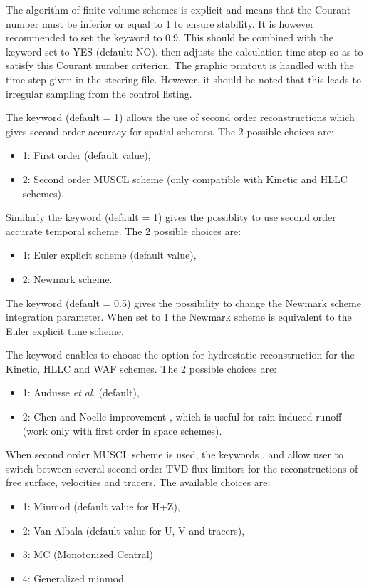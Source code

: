 The algorithm of finite volume schemes is explicit and means that
the Courant number must be inferior or equal to 1 to ensure stability.
It is however recommended to set the keyword 
to 0.9. This should be combined with the keyword 
set to YES (default: NO).
 then adjusts the calculation time step so as to satisfy
this Courant number criterion.
The graphic printout is handled with the time step given in the steering file.
However, it should be noted that this leads to irregular sampling
from the control listing. 

The keyword  (default = 1) allows the
use of second order reconstructions which gives second order accuracy for 
spatial schemes.
The 2 possible choices are:
\begin{itemize}
\item 1: First order (default value),
\item 2: Second order MUSCL scheme \cite{bristeau2005secondorder} (only compatible with 
Kinetic and HLLC schemes).
\end{itemize}

Similarly the keyword  (default = 1) 
gives the possiblity to use second order accurate temporal scheme. 
 The 2 possible choices are:
\begin{itemize}
\item 1: Euler explicit scheme (default value),
\item 2: Newmark scheme.
\end{itemize}
The keyword  (default = 0.5) 
gives the possibility to change the Newmark scheme integration parameter.
When set to 1 the Newmark scheme is equivalent to the Euler 
explicit time scheme.

The keyword 
enables to choose the option for hydrostatic reconstruction for the
Kinetic, HLLC and WAF schemes.
The 2 possible choices are:
\begin{itemize}
\item 1: Audusse \textit{et al.} \cite{audusse2004fast} (default),
\item 2: Chen and Noelle improvement \cite{Chen2017}, 
which is useful for rain induced runoff (work only with first 
order in space schemes).
\end{itemize}

When second order MUSCL scheme is used, the keywords ,
 and 
allow user to switch between several second order TVD flux limitors for
the reconstructions of free surface, velocities and tracers.
The available choices are:
\begin{itemize}
\item 1:  Minmod (default value for H+Z),
\item 2:  Van Albala (default value for U, V and tracers),
\item 3:  MC (Monotonized Central)
\item 4:  Generalized minmod 
\end{itemize}

